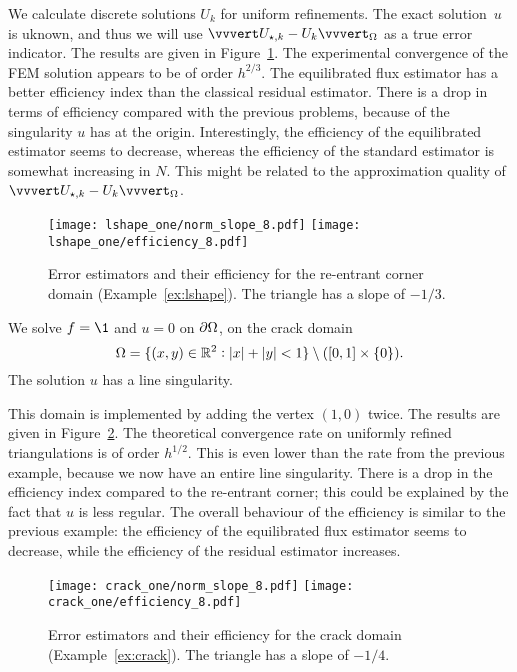 \documentclass[thesis.tex]{subfiles}
\begin{document}
We calculate  discrete solutions $U_k$ for uniform refinements. The 
exact solution~$u$ is uknown, and thus we will use $\uaenorm{U_{\star,k} - U_k}_\O$ as a true error indicator.
The results are given in Figure~\ref{fig:lshapeone}. The experimental
convergence of the FEM solution appears to be of order $h^{2/3}$.
The equilibrated flux estimator has a better efficiency index than the classical residual estimator.
There is a drop in terms of efficiency compared with the previous problems, because of the singularity $u$ has at the origin.
Interestingly, the efficiency of the equilibrated
estimator seems to decrease, whereas the efficiency of the standard estimator is somewhat increasing in $N$. 
This might be related to the approximation quality of $\uaenorm{U_{\star,k} - U_k}_{\O}$.

\begin{figure}
  \centering
  \texttt{[image: lshape\_one/norm\_slope\_8.pdf]}
  \texttt{[image: lshape\_one/efficiency\_8.pdf]}
  \caption{Error estimators and their efficiency for the re-entrant corner domain (Example~\ref{ex:lshape}). The triangle has a slope of $-1/3$.}
  \label{fig:lshapeone}
\end{figure}

\begin{exmp}
  \label{ex:crack}
  We solve $f = \1$ and $u = 0$ on $\partial \Omega$, on the crack domain
  \[
  \Omega=\{(x,y) \in \mathbb{R}^2 : |x|+|y|<1\}\setminus ([0,1] \times \set{0}).
  \]
The solution $u$ has a line singularity.
\end{exmp}
This domain is implemented by adding the vertex $(1,0)$ twice.  
The results are given in Figure~\ref{fig:crackone}.
The theoretical convergence rate on uniformly refined triangulations is of order $h^{1/2}$. This is even lower than the
rate from the previous example, because we now have an entire line singularity.
There is a drop in the efficiency index compared to the re-entrant corner; this could
be explained by the fact that $u$ is less regular. The overall behaviour of the efficiency is similar
to the previous example: the efficiency of the equilibrated flux estimator seems to decrease, 
while the efficiency of the residual estimator increases.
\begin{figure}
  \centering
  \texttt{[image: crack\_one/norm\_slope\_8.pdf]}
  \texttt{[image: crack\_one/efficiency\_8.pdf]}
  \caption{Error estimators and their efficiency for the crack domain (Example~\ref{ex:crack}). The triangle has a slope of $-1/4$.}
  \label{fig:crackone}
\end{figure}
\end{document}
